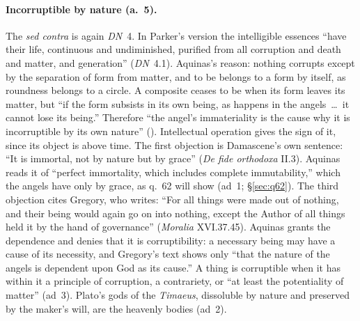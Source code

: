 \paragraph{Incorruptible by nature (a.~5).} The \emph{sed contra} is again
\emph{DN}~4. In Parker's version the intelligible essences ``have their
life, continuous and undiminished, purified from all corruption and death
and matter, and generation'' (\emph{DN}~4.1). Aquinas's reason: nothing
corrupts except by the separation of form from matter, and to be belongs to
a form by itself, as roundness belongs to a circle. A composite ceases to
be when its form leaves its matter, but ``if the form subsists in its own
being, as happens in the angels~\dots\ it cannot lose its being.''
Therefore ``the angel's immateriality is the cause why it is incorruptible
by its own nature'' (). Intellectual
operation gives the sign of it, since its object is above time. The first
objection is Damascene's own sentence: ``It is immortal, not by nature but
by grace'' (\emph{De fide orthodoxa} II.3). Aquinas reads it of ``perfect
immortality, which includes complete immutability,'' which the angels have
only by grace, as q.~62 will show (ad~1; \S\ref{sec:q62}). The third
objection cites Gregory, who writes: ``For all things
were made out of nothing, and their being would again go on into nothing,
except the Author of all things held it by the hand of governance''
(\emph{Moralia} XVI.37.45). Aquinas grants the dependence and denies that
it is corruptibility: a necessary being may have a cause of its necessity,
and Gregory's text shows only ``that the nature of the angels is dependent
upon God as its cause.'' A thing is corruptible when it has within it a
principle of corruption, a contrariety, or ``at least the potentiality of
matter'' (ad~3). Plato's gods of the \emph{Timaeus}, dissoluble by nature
and preserved by the maker's will, are the heavenly bodies (ad~2).

